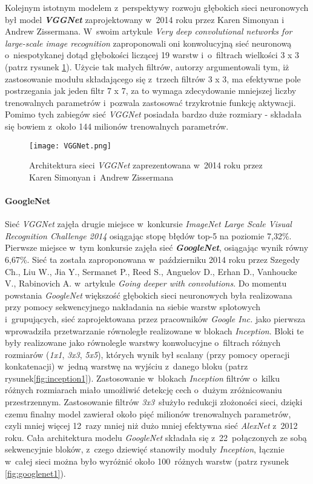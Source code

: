Kolejnym istotnym modelem z~perspektywy rozwoju głębokich sieci neuronowych był model \textbf{\emph{VGGNet}} zaprojektowany w~2014 roku przez Karen Simonyan i Andrew Zissermana. W~swoim artykule \emph{Very deep convolutional networks for large-scale image recognition} \cite{simonyan} zaproponowali oni konwolucyjną sieć neuronową o~niespotykanej dotąd głębokości liczącej 19 warstw i~o~filtrach wielkości 3 x 3 (patrz rysunek \ref{fig:vggnet1}). Użycie tak małych filtrów, autorzy argumentowali tym, iż zastosowanie modułu składającego się z~trzech filtrów 3 x 3, ma efektywne pole postrzegania jak jeden filtr 7 x 7, za to wymaga zdecydowanie mniejszej liczby trenowalnych parametrów i~pozwala zastosować trzykrotnie funkcję aktywacji. Pomimo tych zabiegów sieć \emph{VGGNet} posiadała bardzo duże rozmiary - składała się bowiem z~około 144 milionów trenowalnych parametrów.

\begin{figure}[!h]
    \centering \texttt{[image: VGGNet.png]}
    \captionsetup{format=hang}
    \caption{Architektura sieci \emph{VGGNet} zaprezentowana w~2014 roku przez Karen Simonyan i~Andrew Zissermana \cite{simonyan}}
    \label{fig:vggnet1}
\end{figure}

\paragraph*{GoogleNet}

Sieć \emph{VGGNet} zajęła drugie miejsce w~konkursie \emph{ImageNet Large Scale Visual Recognition Challenge 2014} osiągając stopę błędów top-5 na poziomie 7,32\%. Pierwsze miejsce w~tym konkursie zajęła sieć \textbf{\emph{GoogleNet}}, osiągając wynik równy 6,67\%. Sieć ta została zaproponowana w~październiku 2014 roku przez Szegedy Ch., Liu W., Jia Y., Sermanet P., Reed S., Anguelov D., Erhan D., Vanhoucke V., Rabinovich A. w~artykule \emph{Going deeper with convolutions}. Do momentu powstania \emph{GoogleNet} większość głębokich sieci neuronowych była realizowana przy pomocy sekwencyjnego nakładania na siebie warstw splotowych i~grupujących, sieć zaprojektowana przez pracowników \emph{Google Inc.} jako pierwsza wprowadziła przetwarzanie równoległe realizowane w blokach \emph{Inception}. Bloki te były realizowane jako równolegle warstwy konwolucyjne o~filtrach różnych rozmiarów (\textit{1x1}, \textit{3x3}, \textit{5x5}), których wynik był scalany (przy pomocy operacji konkatenacji) w~jedną warstwę na wyjściu z~danego bloku (patrz rysunek\ref{fig:inception1}). Zastosowanie w~blokach \emph{Inception} filtrów o~kilku różnych rozmiarach miało umożliwić detekcję cech o~dużym zróżnicowaniu przestrzennym. Zastosowanie filtrów  \textit{3x3}~służyło redukcji złożoności sieci, dzięki czemu finalny model zawierał około pięć milionów trenowalnych parametrów, czyli mniej więcej 12~razy mniej niż dużo mniej efektywna sieć \emph{AlexNet} z~2012 roku. Cała architektura modelu \emph{GoogleNet} składała się z~22~połączonych ze sobą sekwencyjnie bloków, z~czego dziewięć stanowiły moduły \emph{Inception}, łącznie w~całej sieci można było wyróżnić około 100~różnych warstw (patrz rysunek \ref{fig:googlenet1}).

